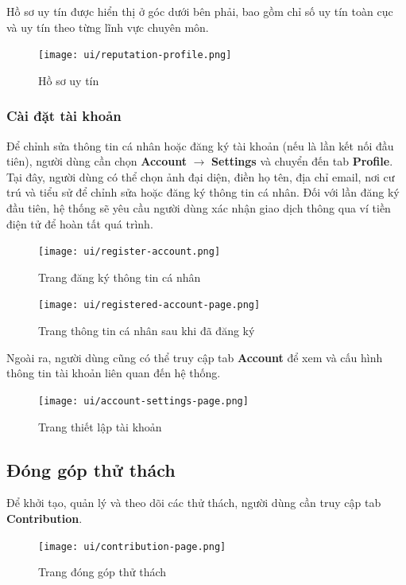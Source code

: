 Hồ sơ uy tín được hiển thị ở góc dưới bên phải, bao gồm chỉ số uy tín toàn cục và uy tín theo từng lĩnh vực chuyên môn.

\begin{figure}[H]
  \centering
  \texttt{[image: ui/reputation-profile.png]}
  \caption{Hồ sơ uy tín}
  \label{fig:reputation-profile}
\end{figure}

\subsubsection{Cài đặt tài khoản}

Để chỉnh sửa thông tin cá nhân hoặc đăng ký tài khoản (nếu là lần kết nối đầu tiên), người dùng cần chọn \textbf{Account} $\rightarrow$ \textbf{Settings} và chuyển đến tab \textbf{Profile}.
Tại đây, người dùng có thể chọn ảnh đại diện, điền họ tên, địa chỉ email, nơi cư trú và tiểu sử để chỉnh sửa hoặc đăng ký thông tin cá nhân.  
Đối với lần đăng ký đầu tiên, hệ thống sẽ yêu cầu người dùng xác nhận giao dịch thông qua ví tiền điện tử để hoàn tất quá trình.

\begin{figure}[H]
  \centering
  \texttt{[image: ui/register-account.png]}
  \caption{Trang đăng ký thông tin cá nhân}
  \label{fig:register-account}
\end{figure}

\begin{figure}[H]
  \centering
  \texttt{[image: ui/registered-account-page.png]}
  \caption{Trang thông tin cá nhân sau khi đã đăng ký}
  \label{fig:registered-account-page}
\end{figure}

Ngoài ra, người dùng cũng có thể truy cập tab \textbf{Account} để xem và cấu hình thông tin tài khoản liên quan đến hệ thống.

\begin{figure}[H]
  \centering
  \texttt{[image: ui/account-settings-page.png]}
  \caption{Trang thiết lập tài khoản}
  \label{fig:account-settings-page}
\end{figure}

\subsection{Đóng góp thử thách}

Để khởi tạo, quản lý và theo dõi các thử thách, người dùng cần truy cập tab \textbf{Contribution}.

\begin{figure}[H]
  \centering
  \texttt{[image: ui/contribution-page.png]}
  \caption{Trang đóng góp thử thách}
  \label{fig:contribution-page}
\end{figure}

